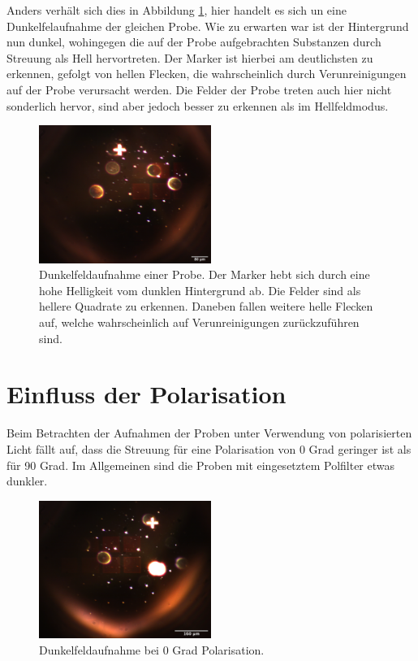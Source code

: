 \newpage
Anders verhält sich dies in Abbildung \ref{fig:312-DF}, hier handelt es sich un eine Dunkelfelaufnahme der gleichen Probe. Wie zu erwarten war ist der Hintergrund nun dunkel, wohingegen die auf der Probe aufgebrachten Substanzen durch Streuung als Hell hervortreten. Der Marker ist hierbei am deutlichsten zu erkennen, gefolgt von hellen Flecken, die wahrscheinlich durch Verunreinigungen auf der Probe verursacht werden. Die Felder der Probe treten auch hier nicht sonderlich hervor, sind aber jedoch besser zu erkennen als im Hellfeldmodus.
\begin{figure}[h]

    \centering
    \includegraphics[width=0.5\textwidth]{Bilder/Auswertung/3.1/image_1.png}
    \caption{Dunkelfeldaufnahme einer Probe. Der Marker hebt sich durch eine hohe Helligkeit vom dunklen Hintergrund ab. Die Felder sind als hellere Quadrate zu erkennen. Daneben fallen weitere helle Flecken auf, welche wahrscheinlich auf Verunreinigungen zurückzuführen sind.}
    \label{fig:312-DF}
\end{figure}

\newpage
\section{Einfluss der Polarisation}
Beim Betrachten der Aufnahmen der Proben unter Verwendung von polarisierten Licht fällt auf, dass die Streuung für eine Polarisation von 0 Grad geringer ist als für 90 Grad. Im Allgemeinen sind die Proben mit eingesetztem Polfilter etwas dunkler.
\begin{figure}[h]
    \centering
    \includegraphics[width=0.5\textwidth]{Bilder/Auswertung/3.1/POL-0-image_2.png}
    \caption{Dunkelfeldaufnahme bei 0 Grad Polarisation.}
    \label{fig:314-POL0}
\end{figure}

